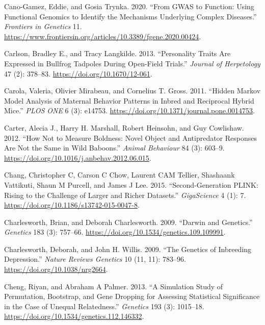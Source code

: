 \documentclass[
]{book}
\newlength{\cslhangindent}
\newlength{\cslentryspacingunit} %
\newenvironment{CSLReferences}[2] %
 {%
  \setlength{\parindent}{0pt}
  \ifodd #1
  \let\oldpar\par
  \def\par{\hangindent=\cslhangindent\oldpar}
  \fi
  \setlength{\parskip}{#2\cslentryspacingunit}
 }%
 {}
\begin{document}
\begin{CSLReferences}{1}{0}
\leavevmode{}%
Cano-Gamez, Eddie, and Gosia Trynka. 2020. {``From {GWAS} to {Function}: {Using Functional Genomics} to {Identify} the {Mechanisms Underlying Complex Diseases}.''} \emph{Frontiers in Genetics} 11. \url{https://www.frontiersin.org/articles/10.3389/fgene.2020.00424}.

\leavevmode{}%
Carlson, Bradley E., and Tracy Langkilde. 2013. {``Personality {Traits Are Expressed} in {Bullfrog Tadpoles} During {Open-Field Trials}.''} \emph{Journal of Herpetology} 47 (2): 378--83. \url{https://doi.org/10.1670/12-061}.

\leavevmode{}%
Carola, Valeria, Olivier Mirabeau, and Cornelius T. Gross. 2011. {``Hidden {Markov Model Analysis} of {Maternal Behavior Patterns} in {Inbred} and {Reciprocal Hybrid Mice}.''} \emph{PLOS ONE} 6 (3): e14753. \url{https://doi.org/10.1371/journal.pone.0014753}.

\leavevmode{}%
Carter, Alecia J., Harry H. Marshall, Robert Heinsohn, and Guy Cowlishaw. 2012. {``How Not to Measure Boldness: Novel Object and Antipredator Responses Are Not the Same in Wild Baboons.''} \emph{Animal Behaviour} 84 (3): 603--9. \url{https://doi.org/10.1016/j.anbehav.2012.06.015}.

\leavevmode{}%
Chang, Christopher C, Carson C Chow, Laurent CAM Tellier, Shashaank Vattikuti, Shaun M Purcell, and James J Lee. 2015. {``Second-Generation {PLINK}: Rising to the Challenge of Larger and Richer Datasets.''} \emph{GigaScience} 4 (1): 7. \url{https://doi.org/10.1186/s13742-015-0047-8}.

\leavevmode{}%
Charlesworth, Brian, and Deborah Charlesworth. 2009. {``Darwin and {Genetics}.''} \emph{Genetics} 183 (3): 757--66. \url{https://doi.org/10.1534/genetics.109.109991}.

\leavevmode{}%
Charlesworth, Deborah, and John H. Willis. 2009. {``The Genetics of Inbreeding Depression.''} \emph{Nature Reviews Genetics} 10 (11, 11): 783--96. \url{https://doi.org/10.1038/nrg2664}.

\leavevmode{}%
Cheng, Riyan, and Abraham A Palmer. 2013. {``A {Simulation Study} of {Permutation}, {Bootstrap}, and {Gene Dropping} for {Assessing Statistical Significance} in the {Case} of {Unequal Relatedness}.''} \emph{Genetics} 193 (3): 1015--18. \url{https://doi.org/10.1534/genetics.112.146332}.


\end{CSLReferences}
\end{document}
